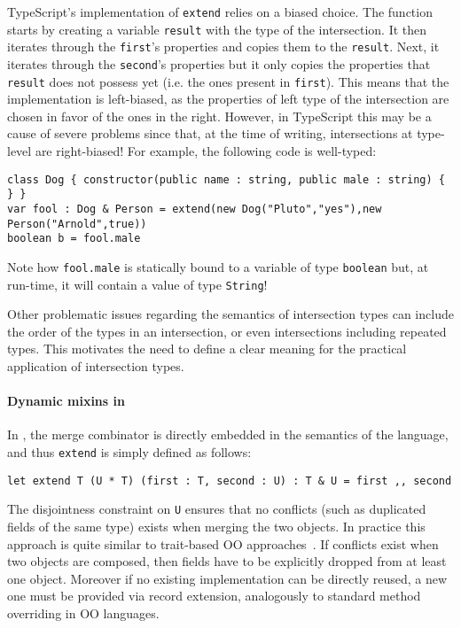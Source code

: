 TypeScript's implementation of \lstinline{extend} relies on a biased choice.
The function starts by creating a variable \lstinline$result$ with the type of the intersection. 
It then iterates through the \lstinline$first$'s properties and copies them to the 
\lstinline$result$.
Next, it iterates through the \lstinline$second$'s properties but it only copies the properties
that \lstinline$result$ does not possess yet (i.e. the ones present in \lstinline$first$).
This means that the implementation is left-biased, as the properties of left type of the intersection
are chosen in favor of the ones in the right.
However, in TypeScript this may be a cause of severe problems since that, at the time of writing,
intersections at type-level are right-biased!
For example, the following code is well-typed:

\begin{lstlisting}
class Dog { constructor(public name : string, public male : string) { } }
var fool : Dog & Person = extend(new Dog("Pluto","yes"),new Person("Arnold",true))
boolean b = fool.male
\end{lstlisting}
Note how \lstinline$fool.male$ is statically bound to a variable of type \lstinline$boolean$ but, at run-time, 
it will contain a value of type \lstinline$String$! 

Other problematic issues regarding the semantics of intersection types can include the order of 
the types in an intersection, or even intersections including repeated types.
This motivates the need to define a clear meaning for the practical application of 
intersection types.

\paragraph{Dynamic mixins in \name}
In \name, the merge combinator is directly embedded in the semantics
of the language, and thus \lstinline{extend} is simply defined as
follows:

\begin{lstlisting}
let extend T (U * T) (first : T, second : U) : T & U = first ,, second 
\end{lstlisting}

\noindent The disjointness constraint on \lstinline{U} ensures that no
conflicts (such as duplicated fields of the same type) exists when merging the two objects. In practice this approach
is quite similar to trait-based OO approaches~\cite{}. If conflicts
exist when two objects are composed, then fields have to be explicitly
dropped from at least one object. Moreover if no existing
implementation can be directly reused, a new one must be provided via
record extension, analogously to standard method overriding in OO
languages.

